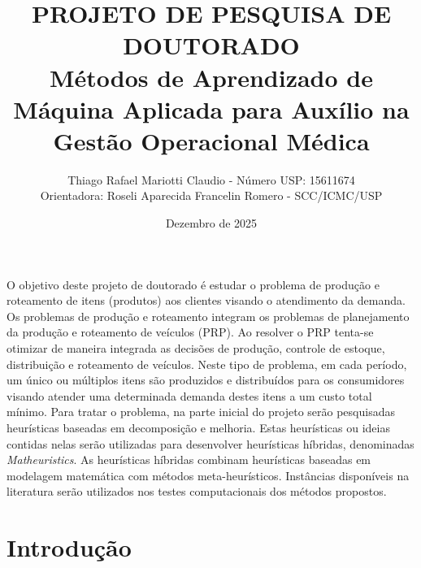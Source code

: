\documentclass[11pt]{article}
\begin{document}
\title{PROJETO DE PESQUISA DE DOUTORADO \\[1em]
Métodos de Aprendizado de Máquina Aplicada para Auxílio na Gestão Operacional Médica}

\author{Thiago Rafael Mariotti Claudio - Número USP: 15611674 \\
Orientadora: Roseli Aparecida Francelin Romero - SCC/ICMC/USP
}

\date{Dezembro de 2025}
\maketitle

\noindent 

O objetivo deste projeto de doutorado é estudar o problema de produção e roteamento de itens (produtos) aos clientes  visando o atendimento da demanda. Os problemas de produção e roteamento integram os problemas de planejamento da produção e roteamento de veículos (PRP). Ao resolver o PRP tenta-se  otimizar de maneira integrada as decisões de produção, controle de estoque, distribuição e roteamento de veículos. Neste tipo de problema, em cada período, um único ou múltiplos itens são produzidos e distribuídos para os consumidores visando atender uma determinada demanda destes itens a um custo total mínimo. Para tratar o problema, na parte inicial do projeto serão pesquisadas heurísticas baseadas em decomposição e melhoria. Estas heurísticas ou ideias contidas nelas serão utilizadas para desenvolver heurísticas híbridas, denominadas \textit{Matheuristics}. As heurísticas híbridas combinam heurísticas baseadas em modelagem matemática com métodos meta-heurísticos.  
Instâncias disponíveis na literatura serão utilizados nos testes computacionais dos métodos propostos. 




\section{Introdução}\label{sec:02}
\end{document}
